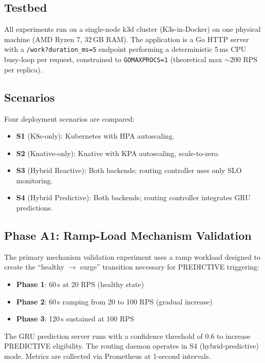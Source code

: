 \documentclass[conference,letterpaper]{IEEEtran}
\begin{document}
\subsection{Testbed}

All experiments run on a single-node k3d cluster (K3s-in-Docker) on one physical machine (AMD Ryzen 7, 32\,GB RAM). The application is a Go HTTP server with a \texttt{/work?duration\_ms=5} endpoint performing a deterministic 5\,ms CPU busy-loop per request, constrained to \texttt{GOMAXPROCS=1} (theoretical max $\sim$200 RPS per replica).

\subsection{Scenarios}

Four deployment scenarios are compared:
\begin{itemize}
    \item \textbf{S1} (K8s-only): Kubernetes with HPA autoscaling.
    \item \textbf{S2} (Knative-only): Knative with KPA autoscaling, scale-to-zero.
    \item \textbf{S3} (Hybrid Reactive): Both backends; routing controller uses only SLO monitoring.
    \item \textbf{S4} (Hybrid Predictive): Both backends; routing controller integrates GRU predictions.
\end{itemize}

\subsection{Phase A1: Ramp-Load Mechanism Validation}

The primary mechanism validation experiment uses a ramp workload designed to create the ``healthy $\rightarrow$ surge'' transition necessary for PREDICTIVE triggering:
\begin{itemize}
    \item \textbf{Phase 1}: 60\,s at 20 RPS (healthy state)
    \item \textbf{Phase 2}: 60\,s ramping from 20 to 100 RPS (gradual increase)
    \item \textbf{Phase 3}: 120\,s sustained at 100 RPS
\end{itemize}

The GRU prediction server runs with a confidence threshold of 0.6 to increase PREDICTIVE eligibility. The routing daemon operates in S4 (hybrid-predictive) mode. Metrics are collected via Prometheus at 1-second intervals.
\end{document}
